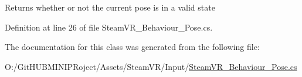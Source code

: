 Returns whether or not the current pose is in a valid state 



Definition at line 26 of file Steam\+V\+R\+\_\+\+Behaviour\+\_\+\+Pose.\+cs.



The documentation for this class was generated from the following file\+:\begin{DoxyCompactItemize}
\item 
O\+:/\+Git\+H\+U\+B\+M\+I\+N\+I\+P\+Roject/\+Assets/\+Steam\+V\+R/\+Input/\mbox{\hyperlink{_steam_v_r___behaviour___pose_8cs}{Steam\+V\+R\+\_\+\+Behaviour\+\_\+\+Pose.\+cs}}\end{DoxyCompactItemize}
